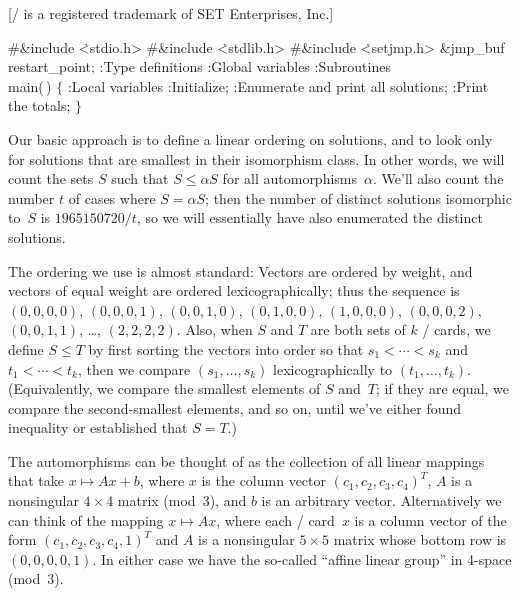 [\SET/ is a registered trademark of SET Enterprises, Inc.]

\Y\B\8\#\&{include} \.{<stdio.h>}\6
\8\#\&{include} \.{<stdlib.h>}\6
\8\#\&{include} \.{<setjmp.h>}\6
\&{jmp\_buf} \\{restart\_point};\7
:Type definitions\X\6
:Global variables\X\6
:Subroutines\X\7
\\{main}(\,)\1\1\2\2\6
${}\{{}$\1\6
:Local variables\X\6
:Initialize\X;\6
:Enumerate and print all solutions\X;\6
:Print the totals\X;\6
\4${}\}{}$\2\par
\fi

Our basic approach is to define a linear ordering on solutions, and to
look only for solutions that are smallest in their isomorphism class.
In other words, we will count the sets $S$ such that $S\le\alpha S$ for
all automorphisms~$\alpha$. We'll also count the number $t$ of cases where
$S=\alpha S$; then the number of distinct solutions isomorphic to~$S$
is $1965150720/t$, so we will essentially have also enumerated the distinct
solutions.

The ordering we use is almost standard: Vectors are ordered
by weight, and vectors of equal weight are ordered lexicographically;
thus the sequence is $(0,0,0,0)$, $(0,0,0,1)$, $(0,0,1,0)$, $(0,1,0,0)$,
$(1,0,0,0)$, $(0,0,0,2)$, $(0,0,1,1)$, \dots, $(2,2,2,2)$.
Also, when $S$ and $T$ are both sets of $k$ \SET/ cards, we define
$S\le T$ by first sorting the vectors into order so that $s_1<\cdots<s_k$ and
$t_1<\cdots<t_k$, then we compare $(s_1,\ldots,s_k)$ lexicographically
to $(t_1,\ldots,t_k)$. (Equivalently, we compare the smallest elements
of $S$ and~$T$; if they are equal, we compare the second-smallest elements,
and so on, until we've either found inequality or established that $S=T$.)

\fi

The automorphisms can be thought of as the collection of all linear
mappings that take $x\mapsto Ax+b$, where $x$ is the column vector
$(c_1,c_2,c_3,c_4)^T$, $A$ is a nonsingular $4\times4$
matrix (mod~3), and $b$ is an arbitrary vector. Alternatively we can
think of the mapping $x\mapsto Ax$, where each \SET/ card~$x$ is a
column vector of the form $(c_1,c_2,c_3,c_4,1)^T$
and $A$ is a nonsingular $5\times5$ matrix whose bottom row is $(0,0,0,0,1)$.
In either case
we have the so-called ``affine linear group'' in 4-space (mod~3).

